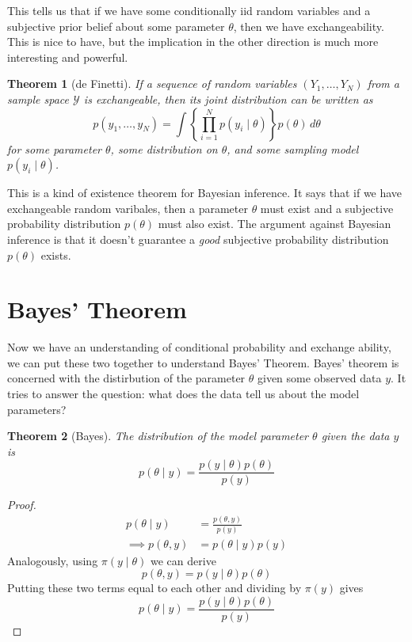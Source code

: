 \documentclass[
]{book}
\newtheorem{theorem}{Theorem}[chapter]
\theoremstyle{definition}
\theoremstyle{definition}
\theoremstyle{definition}
\theoremstyle{definition}
\theoremstyle{remark}
\begin{document}
This tells us that if we have some conditionally iid random variables and a subjective prior belief about some parameter \(\theta\), then we have exchangeability. This is nice to have, but the implication in the other direction is much more interesting and powerful.

\begin{theorem}[de Finetti]
If a sequence of random variables \((Y_1, \ldots, Y_N)\) from a sample space \(\mathcal{Y}\) is exchangeable, then its joint distribution can be written as
\[
p(y_1, \ldots, y_N) = \int \left\{\prod_{i=1}^Np(y_i \mid \theta)\right\} p(\theta)\, d\theta
\]
for some parameter \(\theta\), some distribution on \(\theta\), and some sampling model \(p(y_i \mid \theta)\).
\end{theorem}

This is a kind of existence theorem for Bayesian inference. It says that if we have exchangeable random varibales, then a parameter \(\theta\) must exist and a subjective probability distribution \(p(\theta)\) must also exist. The argument against Bayesian inference is that it doesn't guarantee a \emph{good} subjective probability distribution \(p(\theta)\) exists.

\hypertarget{bayes-theorem}{%
\section{Bayes' Theorem}\label{bayes-theorem}}

Now we have an understanding of conditional probability and exchange ability, we can put these two together to understand Bayes' Theorem. Bayes' theorem is concerned with the distirbution of the parameter \(\theta\) given some observed data \(y\). It tries to answer the question: what does the data tell us about the model parameters?

\begin{theorem}[Bayes]
The distribution of the model parameter \(\theta\) given the data \(y\) is
\[
p(\theta \mid y) = \frac{p(y \mid \theta)p(\theta)}{p(y)}
\]
\end{theorem}

\begin{proof}
\begin{align}
p(\theta \mid y) &= \frac{p(\theta, y)}{p(y)}\\
\implies p(\theta, y) &= p(\theta \mid y)p(y)
\end{align}
Analogously, using \(\pi(y \mid \theta)\) we can derive
\[
p(\theta, y) = p(y \mid \theta)p(\theta)
\]
Putting these two terms equal to each other and dividing by \(\pi(y)\) gives
\[
p(\theta \mid y) = \frac{p(y \mid \theta)p(\theta)}{p(y)}
\]
\end{proof}
\end{document}
